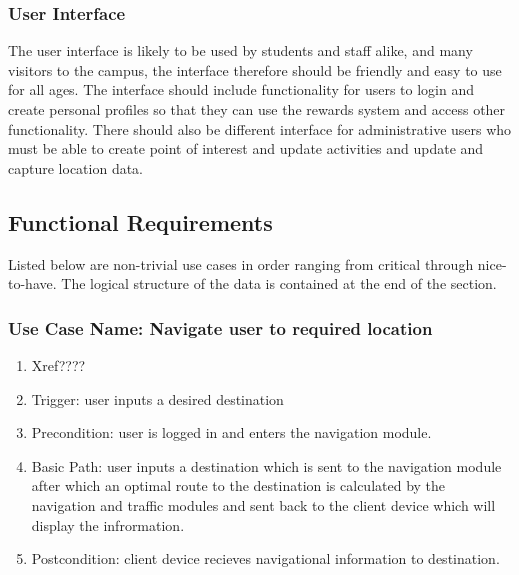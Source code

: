 \documentclass[11pt,a4paper]{article}
\begin{document}
			\subsubsection{User Interface}
				The user interface is likely to be used by students and staff alike, and many visitors to the campus, the interface therefore should be friendly and easy to use for all ages. The interface should include functionality for users to login and create personal profiles
				so that they can use the rewards system and access other functionality. There should also be different interface for administrative users who must be able to create point of interest and update activities and update and capture location data.
	\newpage	
	\subsection{Functional Requirements}
		Listed below are non-trivial use cases in order ranging from critical through nice-to-have. The logical structure of the data is contained at the end of the section.
		
			\subsubsection{Use Case Name: Navigate user to required location}
				\begin{enumerate}
				\renewcommand{\labelenumi}{{\textbf{\arabic{enumi}.}}}
				\item Xref????  %
				\item Trigger: user inputs a desired destination
				\item Precondition: user is logged in and enters the navigation module.
				\item Basic Path: user inputs a destination which is sent to the navigation module after which an optimal route to the destination is calculated by the navigation and traffic modules and sent back to the client device which will display the infrormation.
				\item Postcondition: client device recieves navigational information to destination.
				\end{enumerate}
				
\end{document}
